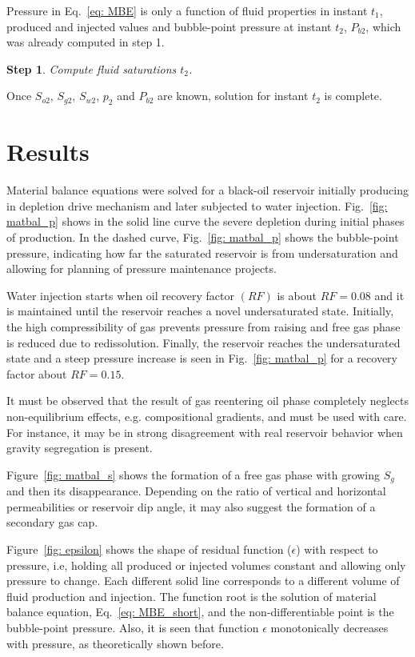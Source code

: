 \documentclass[authoryear,preprint,review,12pt]{elsarticle}
\newtheorem{step}{Step}
\begin{document}
Pressure in Eq.~\eqref{eq: MBE} is only a function of fluid properties in instant $t_1$, produced and injected values and bubble-point pressure at instant $t_2$, $P_{b2}$, which was already computed in step 1.

\begin{step}
Compute fluid saturations $t_2$.
\end{step}

Once $S_{o2}$, $S_{g2}$, $S_{w2}$, $p_2$ and $P_{b2}$ are known, solution for instant $t_2$ is complete.

\section{Results}
Material balance equations were solved for a black-oil reservoir initially producing in depletion drive mechanism and later subjected to water injection. Fig.~\ref{fig: matbal_p} shows in the solid line curve the severe depletion during initial phases of production. In the dashed curve, Fig.~\ref{fig: matbal_p} shows the bubble-point pressure, indicating how far the saturated reservoir is from undersaturation and allowing for planning of pressure maintenance projects.


Water injection starts when oil recovery factor $(RF)$ is about $RF=0.08$ and it is maintained until the reservoir reaches a novel undersaturated state. Initially, the high compressibility of gas prevents pressure from raising and free gas phase is reduced due to redissolution. Finally, the reservoir reaches the undersaturated state and a steep pressure increase is seen in Fig.~\ref{fig: matbal_p} for a recovery factor about $RF=0.15$.

It must be observed that the result of gas reentering oil phase completely neglects non-equilibrium effects, e.g. compositional gradients, and must be used with care. For instance, it may be in strong disagreement with real reservoir behavior when gravity segregation is present.

Figure~\ref{fig: matbal_s} shows the formation of a free gas phase with growing $S_g$ and then its disappearance. Depending on the ratio of vertical and horizontal permeabilities or reservoir dip angle, it may also suggest the formation of a secondary gas cap.

Figure~\ref{fig: epsilon} shows the shape of residual function ($\epsilon$) with respect to pressure, i.e, holding all produced or injected volumes constant and allowing only pressure to change. Each different solid line corresponds to a different volume of fluid production and injection. The function root is the solution of material balance equation, Eq.~\eqref{eq: MBE_short}, and the non-differentiable point is the bubble-point pressure. Also, it is seen that function $\epsilon$ monotonically decreases with pressure, as theoretically shown before.
\end{document}
